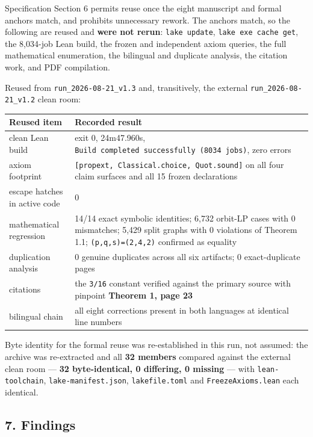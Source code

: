 \documentclass[
  9pt,
  a4paper,
]{article}
\newcounter{none} %
\begin{document}
Specification Section 6 permits reuse once the eight manuscript and
formal anchors match, and prohibits unnecessary rework. The anchors
match, so the following are reused and \textbf{were not rerun}:
\texttt{lake\ update}, \texttt{lake\ exe\ cache\ get}, the 8,034-job
Lean build, the frozen and independent axiom queries, the full
mathematical enumeration, the bilingual and duplicate analysis, the
citation work, and PDF compilation.

Reused from \texttt{run\_2026-08-21\_v1.3} and, transitively, the
external \texttt{run\_2026-08-21\_v1.2} clean room:

{\def\LTcaptype{none} %
\begin{longtable}[]{@{}ll@{}}
\toprule\noalign{}
Reused item & Recorded result \\
\midrule\noalign{}
\endhead
\bottomrule\noalign{}
\endlastfoot
clean Lean build & exit 0, 24m47.960s,
\texttt{Build\ completed\ successfully\ (8034\ jobs)}, zero errors \\
axiom footprint & \texttt{{[}propext,\ Classical.choice,\ Quot.sound{]}}
on all four claim surfaces and all 15 frozen declarations \\
escape hatches in active code & 0 \\
mathematical regression & 14/14 exact symbolic identities; 6,732
orbit-LP cases with 0 mismatches; 5,429 split graphs with 0 violations
of Theorem 1.1; \texttt{(p,q,s)=(2,4,2)} confirmed as equality \\
duplication analysis & 0 genuine duplicates across all six artifacts; 0
exact-duplicate pages \\
citations & the \texttt{3/16} constant verified against the primary
source with pinpoint \textbf{Theorem 1, page 23} \\
bilingual chain & all eight corrections present in both languages at
identical line numbers \\
\end{longtable}
}

Byte identity for the formal reuse was re-established in this run, not
assumed: the archive was re-extracted and all \textbf{32 members}
compared against the external clean room --- \textbf{32 byte-identical,
0 differing, 0 missing} --- with \texttt{lean-toolchain},
\texttt{lake-manifest.json}, \texttt{lakefile.toml} and
\texttt{FreezeAxioms.lean} each identical.

\subsection{7. Findings}\label{7-findings}
\end{document}
